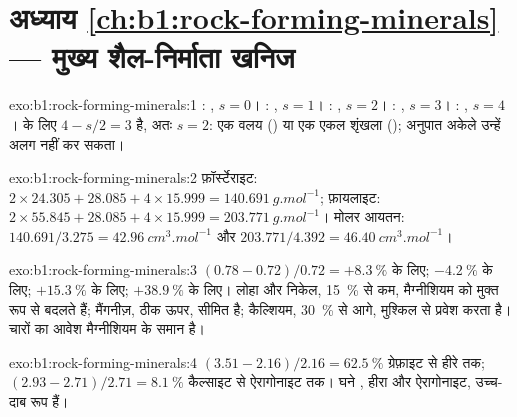 \section*{अध्याय \ref{ch:b1:rock-forming-minerals} --- मुख्य शैल-निर्माता खनिज}

\begin{solution}{exo:b1:rock-forming-minerals:1}
: , $s = 0$। : ,
$s = 1$। : , $s = 2$। :
, $s = 3$। : , $s = 4$। 
के लिए $4 - s/2 = 3$ है, अतः $s = 2$: एक वलय () या एक एकल शृंखला
(); अनुपात अकेले उन्हें अलग नहीं कर सकता।
\end{solution}

\begin{solution}{exo:b1:rock-forming-minerals:2}
फ़ॉर्स्टेराइट: $2\times24.305 + 28.085 + 4\times15.999 =
\qty{140.691}{g.mol^{-1}}$; फ़ायलाइट: $2\times55.845 + 28.085 +
4\times15.999 = \qty{203.771}{g.mol^{-1}}$। मोलर आयतन:
$140.691/3.275 = \qty{42.96}{cm^3.mol^{-1}}$ और $203.771/4.392 =
\qty{46.40}{cm^3.mol^{-1}}$।
\end{solution}

\begin{solution}{exo:b1:rock-forming-minerals:3}
$(0.78 - 0.72)/0.72 = +\qty{8.3}{\percent}$  के लिए;
$-\qty{4.2}{\percent}$  के लिए; $+\qty{15.3}{\percent}$  के लिए; $+\qty{38.9}{\percent}$ 
के लिए। लोहा और निकेल, \qty{15}{\percent} से कम, मैग्नीशियम को मुक्त रूप से बदलते हैं; मैंगनीज़, ठीक ऊपर, सीमित है;
कैल्शियम, \qty{30}{\percent} से आगे, मुश्किल से प्रवेश करता है। चारों का आवेश मैग्नीशियम के समान है।
\end{solution}

\begin{solution}{exo:b1:rock-forming-minerals:4}
$(3.51 - 2.16)/2.16 = \qty{62.5}{\percent}$ ग्रेफ़ाइट से हीरे तक;
$(2.93 - 2.71)/2.71 = \qty{8.1}{\percent}$ कैल्साइट से ऐरागोनाइट तक। घने , हीरा और ऐरागोनाइट, उच्च-दाब रूप हैं।
\end{solution}

